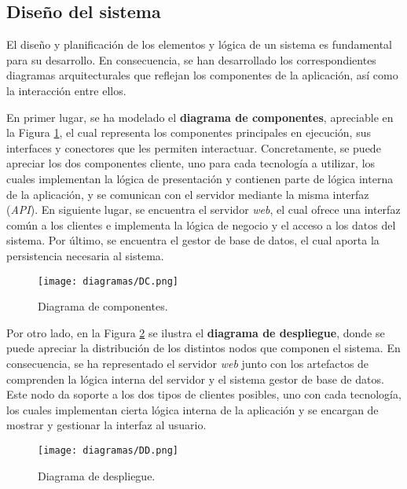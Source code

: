 \documentclass[11pt, a4paper, titlepage]{article}
\begin{document}
\newpage

\subsection{Diseño del sistema}

El diseño y planificación de los elementos y lógica de un sistema es fundamental para su desarrollo. En consecuencia, se han desarrollado los correspondientes diagramas arquitecturales que reflejan los componentes de la aplicación, así como la interacción entre ellos. \newline

En primer lugar, se ha modelado el \textbf{diagrama de componentes}, apreciable en la Figura \ref{ref:componentes}, el cual representa los componentes principales en ejecución, sus interfaces y conectores que les permiten interactuar. Concretamente, se puede apreciar los dos componentes cliente, uno para cada tecnología a utilizar, los cuales implementan la lógica de presentación y contienen parte de lógica interna de la aplicación, y se comunican con el servidor mediante la misma interfaz (\textit{API}). En siguiente lugar, se encuentra el servidor \textit{web}, el cual ofrece una interfaz común a los clientes e implementa la lógica de negocio y el acceso a los datos del sistema. Por último, se encuentra el gestor de base de datos, el cual aporta la persistencia necesaria al sistema.

\begin{figure}[h!]
    \centering
    \texttt{[image: diagramas/DC.png]}
    \caption{Diagrama de componentes.}
    \label{ref:componentes}
\end{figure}


Por otro lado, en la Figura \ref{ref:despliegue} se ilustra el \textbf{diagrama de despliegue}, donde se puede apreciar la distribución de los distintos nodos que componen el sistema. En consecuencia, se ha representado el servidor \textit{web} junto con los artefactos de comprenden la lógica interna del servidor y el sistema gestor de base de datos. Este nodo da soporte a los dos tipos de clientes posibles, uno con cada tecnología, los cuales implementan cierta lógica interna de la aplicación y se encargan de mostrar y gestionar la interfaz al usuario. 

\begin{figure}[h!]
    \centering
    \texttt{[image: diagramas/DD.png]}
    \caption{Diagrama de despliegue.}
    \label{ref:despliegue}
\end{figure}
\end{document}
